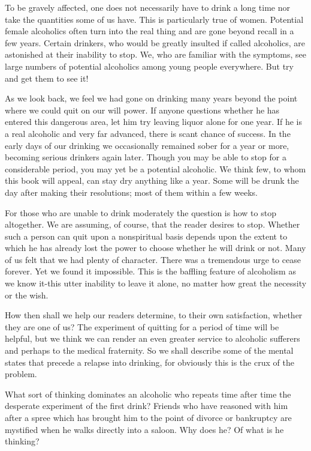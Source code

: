 \begin{biblechapter}
    To be gravely affected, 
    one does not necessarily have to drink a long time 
    nor take the quantities some of us have. 
\verse This is particularly true of women. 
\verse Potential female alcoholics often turn into the real thing 
    and are gone beyond recall in a few years. 
\verse Certain drinkers, 
    who would be greatly insulted if called alcoholics, 
    are astonished at their inability to stop. 
\verse We, who are familiar with the symptoms, 
    see large numbers of potential alcoholics 
    among young people everywhere. 
\verse But try and get them to see it!  

\verse As we look back, 
    we feel we had gone on drinking many years beyond the point 
    where we could quit on our will power. 
\verse If anyone questions whether he has entered this dangerous area, 
    let him try leaving liquor alone for one year. 
\verse If he is a real alcoholic and very far advanced, 
    there is scant chance of success. 
\verse In the early days of our drinking 
    we occasionally remained sober for a year or more, 
    becoming serious drinkers again later. 
\verse Though you may be able to stop for a considerable period, 
    you may yet be a potential alcoholic. 
\verse We think few, to whom this book will appeal, 
    can stay dry anything like a year. 
\verse Some will be drunk the day after making their resolutions; 
    most of them within a few weeks.
\end{biblechapter}


\begin{biblechapter}
    For those who are unable to drink moderately 
    the question is how to stop altogether. 
\verse We are assuming, of course, that the reader desires to stop. 
\verse Whether such a person can quit upon a nonspiritual basis 
    depends upon the extent to which 
    he has already lost the power to choose 
    whether he will drink or not. 
\verse Many of us felt that we had plenty of character. 
\verse There was a tremendous urge to cease forever. 
\verse Yet we found it impossible. 
\verse This is the baffling feature of alcoholism as we know it-this 
    utter inability to leave it alone, 
    no matter how great the necessity or the wish.

\verse How then shall we help our readers determine, 
    to their own satisfaction, 
    whether they are one of us? 
\verse The experiment of quitting for a period of time will be helpful, 
    but we think we can render an even greater service 
    to alcoholic sufferers 
    and perhaps to the medical fraternity. 
\verse So we shall describe some of the mental states that 
    precede a relapse into drinking, 
    for obviously this is the crux of the problem.

\verse What sort of thinking dominates an alcoholic who 
    repeats time after time the desperate experiment of the first drink? 
\verse Friends who have reasoned with him after a spree which 
    has brought him to the point of divorce or bankruptcy 
    are mystified when he walks directly into a saloon. 
\verse Why does he? 
\verse Of what is he thinking?
\end{biblechapter}


